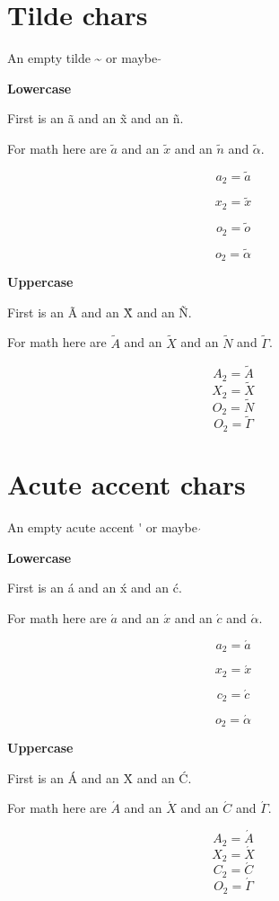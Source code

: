 \documentclass{article}
\begin{document}
\section{Tilde chars}

An empty tilde \~{} or maybe $\tilde{}$

\textbf{Lowercase}

First is an \~{a} and an \~{x} and an \~{n}.

For math here are $\tilde{a}$ and an $\tilde{x}$ and an $\tilde{n}$ and $\tilde{\alpha}$.

$$a_2=\tilde{a}$$

$$x_2=\tilde{x}$$

$$o_2=\tilde{o}$$

$$o_2=\tilde{\alpha}$$


\textbf{Uppercase}

First is an \~{A} and an \~{X} and an \~{N}.

For math here are $\tilde{A}$ and an $\tilde{X}$ and an $\tilde{N}$ and $\tilde{\Gamma}$.

$$A_2=\tilde{A}$$
$$X_2=\tilde{X}$$
$$O_2=\tilde{N}$$
$$O_2=\tilde{\Gamma}$$




\section{Acute accent chars}

An empty acute accent \'{} or maybe $\acute{}$

\textbf{Lowercase}

First is an \'{a} and an \'{x} and an \'{c}.

For math here are $\acute{a}$ and an $\acute{x}$ and an $\acute{c}$ and $\acute{\alpha}$.

$$a_2=\acute{a}$$

$$x_2=\acute{x}$$

$$c_2=\acute{c}$$

$$o_2=\acute{\alpha}$$

\textbf{Uppercase}

First is an \'{A} and an \'{X} and an \'{C}.

For math here are $\acute{A}$ and an $\acute{X}$ and an $\acute{C}$ and $\acute{\Gamma}$.

$$A_2=\acute{A}$$
$$X_2=\acute{X}$$
$$C_2=\acute{C}$$
$$O_2=\acute{\Gamma}$$


\end{document}
